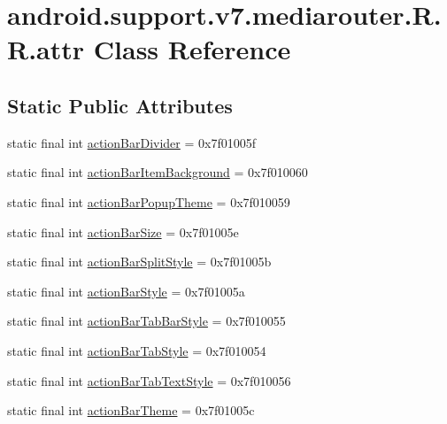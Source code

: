 \hypertarget{classandroid_1_1support_1_1v7_1_1mediarouter_1_1_r_1_1attr}{
\section{android.support.v7.mediarouter.R.R.attr Class Reference}
\label{classandroid_1_1support_1_1v7_1_1mediarouter_1_1_r_1_1attr}
}
\subsection*{Static Public Attributes}
\begin{CompactItemize}
\item 
static final int \hyperlink{classandroid_1_1support_1_1v7_1_1mediarouter_1_1_r_1_1attr_988bd315be705e769eb867ddbc158c0d}{actionBarDivider} = 0x7f01005f
\item 
static final int \hyperlink{classandroid_1_1support_1_1v7_1_1mediarouter_1_1_r_1_1attr_401260b63338c6379f1f0152bc7890f0}{actionBarItemBackground} = 0x7f010060
\item 
static final int \hyperlink{classandroid_1_1support_1_1v7_1_1mediarouter_1_1_r_1_1attr_b13690ea2460d1261585c84b545de047}{actionBarPopupTheme} = 0x7f010059
\item 
static final int \hyperlink{classandroid_1_1support_1_1v7_1_1mediarouter_1_1_r_1_1attr_5362ec94cac30b8e33f2f66424a08f04}{actionBarSize} = 0x7f01005e
\item 
static final int \hyperlink{classandroid_1_1support_1_1v7_1_1mediarouter_1_1_r_1_1attr_c103047e516bc7a7b3ef4a6d8a057b9c}{actionBarSplitStyle} = 0x7f01005b
\item 
static final int \hyperlink{classandroid_1_1support_1_1v7_1_1mediarouter_1_1_r_1_1attr_c1b3da10a9140262290358f84d92448a}{actionBarStyle} = 0x7f01005a
\item 
static final int \hyperlink{classandroid_1_1support_1_1v7_1_1mediarouter_1_1_r_1_1attr_f54c98919e134581bc5c9afe8810945b}{actionBarTabBarStyle} = 0x7f010055
\item 
static final int \hyperlink{classandroid_1_1support_1_1v7_1_1mediarouter_1_1_r_1_1attr_ef52b126a227a145b9060f7d5e410927}{actionBarTabStyle} = 0x7f010054
\item 
static final int \hyperlink{classandroid_1_1support_1_1v7_1_1mediarouter_1_1_r_1_1attr_b97a71c7d7710ecc10d34d0581f49590}{actionBarTabTextStyle} = 0x7f010056
\item 
static final int \hyperlink{classandroid_1_1support_1_1v7_1_1mediarouter_1_1_r_1_1attr_22882c85ee37b45f4ad87d893cde5683}{actionBarTheme} = 0x7f01005c

\end{CompactItemize}
